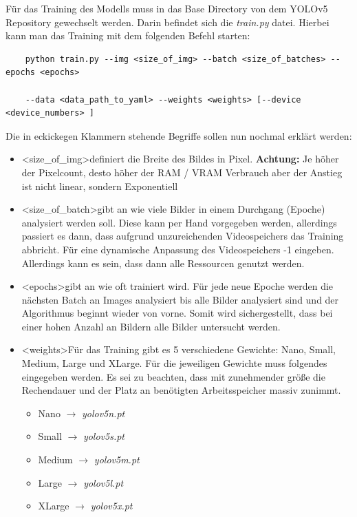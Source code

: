 Für das Training des Modells muss in das  Base Directory von dem YOLOv5 Repository gewechselt werden. Darin befindet sich die \textit{train.py} datei. Hierbei kann man das Training mit dem folgenden Befehl starten:
\begin{verbatim}
    python train.py --img <size_of_img> --batch <size_of_batches> --epochs <epochs>
    
    --data <data_path_to_yaml> --weights <weights> [--device <device_numbers> ]
\end{verbatim}
Die in eckickegen Klammern stehende Begriffe sollen nun nochmal erklärt werden:
\begin{itemize}
    \item \textless size\_of\_img\textgreater definiert die Breite des Bildes in Pixel. \textbf{Achtung:} Je höher der Pixelcount, desto höher der RAM / VRAM Verbrauch aber der Anstieg ist nicht linear, sondern Exponentiell
    \item \textless size\_of\_batch\textgreater gibt an wie viele Bilder in einem Durchgang (Epoche) analysiert werden soll. Diese kann per Hand vorgegeben werden, allerdings passiert es dann, dass aufgrund unzureichenden Videospeichers das Training abbricht. Für eine dynamische Anpassung des Videospeichers -1 eingeben. Allerdings kann es sein, dass dann alle Ressourcen genutzt werden.
    \item \textless epochs\textgreater gibt an wie oft trainiert wird. Für jede neue Epoche werden die nächsten Batch an Images analysiert bis alle Bilder analysiert sind und der Algorithmus beginnt wieder von vorne. Somit wird sichergestellt, dass bei einer hohen Anzahl an Bildern alle Bilder untersucht werden.
    \item \textless weights\textgreater Für das Training gibt es 5 verschiedene Gewichte: Nano, Small, Medium, Large und XLarge. Für die jeweiligen Gewichte muss folgendes eingegeben werden. Es sei zu beachten, dass mit zunehmender größe die Rechendauer und der Platz an benötigten Arbeitsspeicher massiv zunimmt.
    \begin{itemize}
        \item Nano $\rightarrow $ \textit{yolov5n.pt}
        \item Small $\rightarrow $ \textit{yolov5s.pt}
        \item Medium $\rightarrow $ \textit{yolov5m.pt}
        \item Large $\rightarrow $ \textit{yolov5l.pt}
        \item XLarge $\rightarrow $ \textit{yolov5x.pt}

\end{itemize}
\end{itemize}
